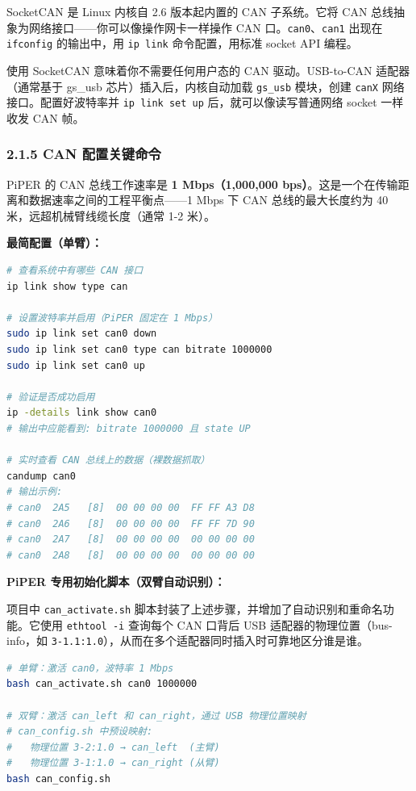 \documentclass[UTF8,a4paper,11pt]{ctexart}
\begin{document}
SocketCAN 是 Linux 内核自 2.6 版本起内置的 CAN 子系统。它将 CAN 总线抽象为网络接口——你可以像操作网卡一样操作 CAN 口。\texttt{can0}、\texttt{can1} 出现在 \texttt{ifconfig} 的输出中，用 \texttt{ip link} 命令配置，用标准 socket API 编程。

使用 SocketCAN 意味着你不需要任何用户态的 CAN 驱动。USB-to-CAN 适配器（通常基于 gs_usb 芯片）插入后，内核自动加载 \texttt{gs_usb} 模块，创建 \texttt{canX} 网络接口。配置好波特率并 \texttt{ip link set up} 后，就可以像读写普通网络 socket 一样收发 CAN 帧。

\subsubsection{2.1.5 CAN 配置关键命令}

PiPER 的 CAN 总线工作速率是 \textbf{1 Mbps（1,000,000 bps）}。这是一个在传输距离和数据速率之间的工程平衡点——1 Mbps 下 CAN 总线的最大长度约为 40 米，远超机械臂线缆长度（通常 1-2 米）。

\textbf{最简配置（单臂）：}
\begin{lstlisting}[language=bash]
# 查看系统中有哪些 CAN 接口
ip link show type can

# 设置波特率并启用（PiPER 固定在 1 Mbps）
sudo ip link set can0 down
sudo ip link set can0 type can bitrate 1000000
sudo ip link set can0 up

# 验证是否成功启用
ip -details link show can0
# 输出中应能看到: bitrate 1000000 且 state UP

# 实时查看 CAN 总线上的数据（裸数据抓取）
candump can0
# 输出示例:
# can0  2A5   [8]  00 00 00 00  FF FF A3 D8
# can0  2A6   [8]  00 00 00 00  FF FF 7D 90
# can0  2A7   [8]  00 00 00 00  00 00 00 00
# can0  2A8   [8]  00 00 00 00  00 00 00 00
\end{lstlisting}

\textbf{PiPER 专用初始化脚本（双臂自动识别）：}

项目中 \texttt{can_activate.sh} 脚本封装了上述步骤，并增加了自动识别和重命名功能。它使用 \texttt{ethtool -i} 查询每个 CAN 口背后 USB 适配器的物理位置（bus-info，如 \texttt{3-1.1:1.0}），从而在多个适配器同时插入时可靠地区分谁是谁。

\begin{lstlisting}[language=bash]
# 单臂：激活 can0，波特率 1 Mbps
bash can_activate.sh can0 1000000

# 双臂：激活 can_left 和 can_right，通过 USB 物理位置映射
# can_config.sh 中预设映射:
#   物理位置 3-2:1.0 → can_left  (主臂)
#   物理位置 3-1:1.0 → can_right (从臂)
bash can_config.sh
\end{lstlisting}
\end{document}
